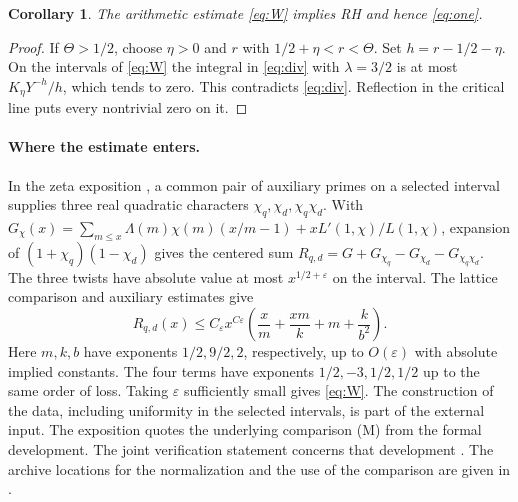 \documentclass[11pt,a4paper]{article}
\newtheorem{corollary}[theorem]{Corollary}
\newcommand{\eps}{\varepsilon}
\begin{document}
\begin{corollary}\label{cor:rh}
The arithmetic estimate \eqref{eq:W} implies RH and hence \eqref{eq:one}.
\end{corollary}
\begin{proof}
If $\Theta>1/2$, choose $\eta>0$ and $r$ with $1/2+\eta<r<\Theta$. Set $h=r-1/2-\eta$. On the intervals of \eqref{eq:W} the integral in \eqref{eq:div} with $\lambda=3/2$ is at most $K_\eta Y^{-h}/h$, which tends to zero. This contradicts \eqref{eq:div}. Reflection in the critical line puts every nontrivial zero on it.
\end{proof}

\paragraph{Where the estimate enters.}
In the zeta exposition \cite[Part I, \S I.6 and Part II, (II.6)--(II.8), (A)]{rub}, a common pair of auxiliary primes on a selected interval supplies three real quadratic characters $\chi_q,\chi_d,\chi_q\chi_d$. With $G_\chi(x)=\sum_{m\le x}\Lambda(m)\chi(m)(x/m-1)+xL'(1,\chi)/L(1,\chi)$, expansion of $(1+\chi_q)(1-\chi_d)$ gives the centered sum $R_{q,d}=G+G_{\chi_q}-G_{\chi_d}-G_{\chi_q\chi_d}$. The three twists have absolute value at most $x^{1/2+\eps}$ on the interval. The lattice comparison and auxiliary estimates give
\[
 R_{q,d}(x)\le C_\eps x^{C\eps}
 \left(\frac{x}{m}+\frac{xm}{k}+m+\frac{k}{b^2}\right).
\]
Here $m,k,b$ have exponents $1/2,9/2,2$, respectively, up to $O(\eps)$ with absolute implied constants. The four terms have exponents $1/2,-3,1/2,1/2$ up to the same order of loss. Taking $\eps$ sufficiently small gives \eqref{eq:W}. The construction of the data, including uniformity in the selected intervals, is part of the external input. The exposition quotes the underlying comparison (M) from the formal development. The joint verification statement concerns that development \cite{lean}. The archive locations for the normalization and the use of the comparison are given in \cite{archive}.
\end{document}
